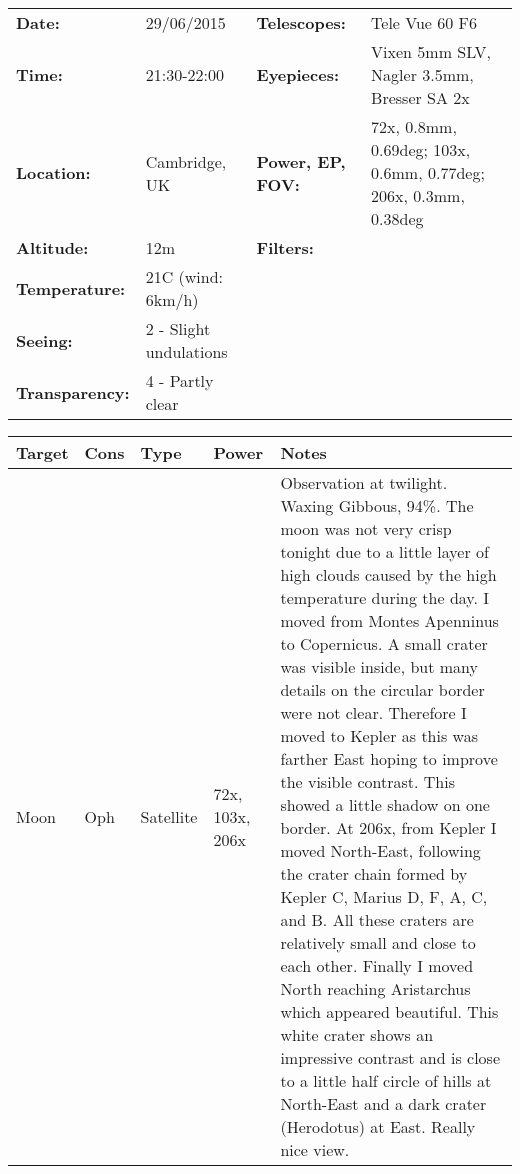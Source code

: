 \begin{tabular}{ p{0.9in} p{1.3in} p{1.2in} p{5.2in}}
{\bf Date:} & 29/06/2015 & {\bf Telescopes:} & Tele Vue 60 F6 \\ 
{\bf Time:} & 21:30-22:00 & {\bf Eyepieces:} & Vixen 5mm SLV, Nagler 3.5mm, Bresser SA 2x \\ 
{\bf Location:} & Cambridge, UK & {\bf Power, EP, FOV:} & 72x, 0.8mm, 0.69deg; 103x, 0.6mm, 0.77deg; 206x, 0.3mm, 0.38deg \\ 
{\bf Altitude:} & 12m & {\bf Filters:} &  \\ 
{\bf Temperature:} & 21C (wind: 6km/h) & & \\ 
{\bf Seeing:} & 2 - Slight undulations & & \\ 
{\bf Transparency:} & 4 - Partly clear & & \\ 
\end{tabular}
\centering 
\begin{longtable}{ p{0.7in}  p{0.3in}  p{0.6in}  p{0.9in}  p{5.8in} }
\hline 
{\bf Target} & {\bf Cons} & {\bf Type} & {\bf Power} & {\bf Notes} \\ 
\hline 
Moon & Oph & Satellite & 72x, 103x, 206x & Observation at twilight. Waxing Gibbous, 94\%. The moon was not very crisp tonight due to a little layer of high clouds caused by the high temperature during the day. I moved from Montes Apenninus to Copernicus. A small crater was visible inside, but many details on the circular border were not clear. Therefore I moved to Kepler as this was farther East hoping to improve the visible contrast. This showed a little shadow on one border. At 206x, from Kepler I moved North-East, following the crater chain formed by Kepler C, Marius D, F, A, C, and B. All these craters are relatively small and close to each other. Finally I moved North reaching Aristarchus which appeared beautiful. This white crater shows an impressive contrast and is close to a little half circle of hills at North-East and a dark crater (Herodotus) at East. Really nice view. \\ 
\hline 
\end{longtable} 

